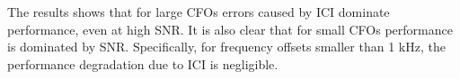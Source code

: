 The results shows that for large CFOs errors caused by ICI dominate performance, even at high SNR. It is also
clear that for small CFOs performance is dominated by SNR. Specifically, for frequency offsets smaller than 1 kHz, the
performance degradation due to ICI is negligible.\\


